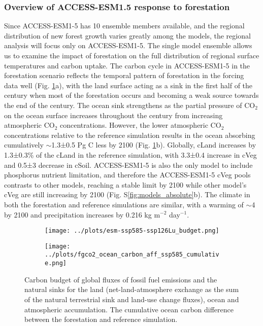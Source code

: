 \documentclass[]{article}
\begin{document}
\subsubsection{Overview of ACCESS-ESM1.5 response to forestation}

Since ACCESS-ESM1-5 has 10 ensemble members available, and the regional distribution of new forest growth varies greatly among the models, the regional analysis will focus only on ACCESS-ESM1-5.
The single model ensemble allows us to examine the impact of forestation on the full distribution of regional surface temperatures and carbon uptake.
The carbon cycle in ACCESS-ESM1-5 in the forestation scenario reflects the temporal pattern of forestation in the forcing data well (Fig. \ref{fig:global_carbon_budget}a), with the land surface acting as a sink in the first half of the century when most of the forestation occurs and becoming a weak source towards the end of the century.
The ocean sink strengthens as the partial pressure of CO$_2$ on the ocean surface increases throughout the century from increasing atmospheric CO$_2$ concentrations.
However, the lower atmospheric CO$_2$ concentrations relative to the reference simulation results in the ocean absorbing cumulatively $\sim$1.3±0.5 Pg C less by 2100 (Fig. \ref{fig:global_carbon_budget}b).
Globally, cLand increases by 1.3±0.3\% of the cLand in the reference simulation, with 3.3±0.4 increase in cVeg and 0.5±3 decrease in cSoil.
ACCESS-ESM1-5 is also the only model to include phosphorus nutrient limitation, and therefore the ACCESS-ESM1-5 cVeg pools contrasts to other models, reaching a stable limit by 2100 while other model's cVeg are still increasing by 2100 (Fig. S\ref{fig:models_absolute}b).
The climate in both the forestation and reference simulations are similar, with a warming of $\sim$4 \textcelsius{} by 2100 and precipitation increases by 0.216 kg m$^{-2}$ day$^{-1}$.

\begin{figure}[H]
    \centering
    \begin{subfigure}[b]{0.4\linewidth}
        \texttt{[image: ../plots/esm-ssp585-ssp126Lu\_budget.png]}
    \end{subfigure}
    \begin{subfigure}[b]{0.4\linewidth}
        \texttt{[image: ../plots/fgco2\_ocean\_carbon\_aff\_ssp585\_cumulative.png]}
    \end{subfigure}
    \caption{Carbon budget of global fluxes of fossil fuel emissions and the natural sinks for the land (net-land-atmosphere exchange as the sum of the natural terrestrial sink and land-use change fluxes), ocean and atmospheric accumulation. The cumulative ocean carbon difference between the forestation and reference simulation.}
    \label{fig:global_carbon_budget}
\end{figure}
\end{document}
